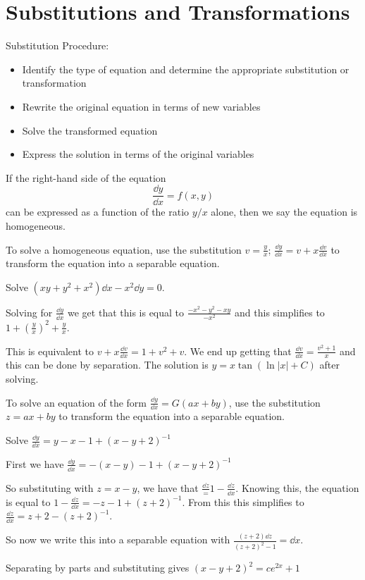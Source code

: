 \documentclass[../diffeq.tex]{subfiles}
\begin{document}
\section{Substitutions and Transformations}
Substitution Procedure:
\begin{itemize}
    \item Identify the type of equation and determine the appropriate substitution or transformation 
    \item Rewrite the original equation in terms of new variables 
    \item Solve the transformed equation 
    \item Express the solution in terms of the original variables 
\end{itemize}

\pagebreak
\begin{definition}
    If the right-hand side of the equation
    \[ \frac{\dd y}{\dd x} = f(x,y) \]
    can be expressed as a function of the ratio $y/x$ alone, then we say the equation is homogeneous.
\end{definition}

To solve a homogeneous equation, use the substitution $v=\frac{y}{x}$; $\frac{\dd y}{\dd x} = v+x\frac{\dd v}{\dd x}$ to transform the equation into a separable equation.

\begin{example}
    Solve $(xy+y^2+x^2)\dd x - x^2\dd y = 0$.

    Solving for $\frac{\dd y}{\dd x}$ we get that this is equal to $\frac{-x^2-y^2-xy}{-x^2}$ and this simplifies to $1+\left(\frac{y}{x}\right)^2 + \frac{y}{x}$.

    This is equivalent to $v+x\frac{\dd v}{\dd x} = 1+v^2+v$. We end up getting that $\frac{\dd v}{\dd x}=\frac{v^2+1}{x}$ and this can be done by separation. The solution is $y=x\tan(\ln|x|+C)$ after solving.
\end{example}

To solve an equation of the form $\frac{\dd y}{\dd x}=G(ax+by)$, use the substitution $z=ax+by$ to transform the equation into a separable equation.
\begin{example}
    Solve $\frac{\dd y}{\dd x}=y-x-1+(x-y+2)^{-1}$

    First we have $\frac{\dd y}{\dd x}=-(x-y)-1+(x-y+2)^{-1}$

    So substituting with $z=x-y$, we have that $\frac{\dd z}=1-\frac{\dd z}{\dd x}$. Knowing this, the equation is equal to $1-\frac{\dd z}{\dd x}=-z-1+(z+2)^{-1}$. From this this simplifies to 
    $\frac{\dd z}{\dd x}=z+2-(z+2)^{-1}$. 

    So now we write this into a separable equation with $\frac{(z+2)\dd z}{(z+2)^2-1} = \dd x$.

    Separating by parts and substituting gives $(x-y+2)^2=ce^{2x}+1$
\end{example}
\end{document}
